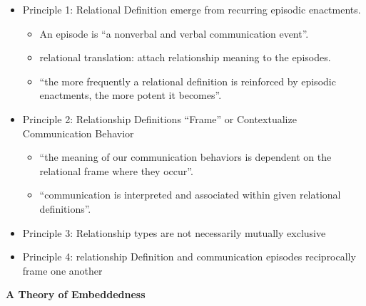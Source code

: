 \documentclass[
]{book}
\providecommand{\tightlist}{%
  \setlength{\itemsep}{0pt}\setlength{\parskip}{0pt}}
\begin{document}
\begin{itemize}
\item
  Principle 1: Relational Definition emerge from recurring episodic enactments.

  \begin{itemize}
  \tightlist
  \item
    An episode is ``a nonverbal and verbal communication event''.
  \item
    relational translation: attach relationship meaning to the episodes.
  \item
    ``the more frequently a relational definition is reinforced by episodic enactments, the more potent it becomes''.
  \end{itemize}
\item
  Principle 2: Relationship Definitions ``Frame'' or Contextualize Communication Behavior

  \begin{itemize}
  \tightlist
  \item
    ``the meaning of our communication behaviors is dependent on the relational frame where they occur''.\\
  \item
    ``communication is interpreted and associated within given relational definitions''.
  \end{itemize}
\item
  Principle 3: Relationship types are not necessarily mutually exclusive
\item
  Principle 4: relationship Definition and communication episodes reciprocally frame one another
\end{itemize}

\textbf{A Theory of Embeddedness}
\end{document}
